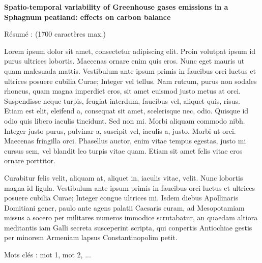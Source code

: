 {\vfill

\begin{center}
	\large \textbf{Spatio-temporal variability of Greenhouse gases emissions in a Sphagnum peatland: effects on carbon balance}
\end{center}

\begin{framed}
	\begin{minipage}{\dimexpr\textwidth-2\fboxrule-2\fboxsep}
	R\'esum\'e : (1700 caract\`eres max.)\par
	Lorem ipsum dolor sit amet, consectetur adipiscing elit. Proin volutpat ipsum id purus ultrices lobortis. Maecenas ornare enim quis eros. Nunc eget mauris ut quam malesuada mattis. Vestibulum ante ipsum primis in faucibus orci luctus et ultrices posuere cubilia Curae; Integer vel tellus. Nam rutrum, purus non sodales rhoncus, quam magna imperdiet eros, sit amet euismod justo metus at orci. Suspendisse neque turpis, feugiat interdum, faucibus vel, aliquet quis, risus. Etiam est elit, eleifend a, consequat sit amet, scelerisque nec, odio. Quisque id odio quis libero iaculis tincidunt. Sed non mi. Morbi aliquam commodo nibh. Integer justo purus, pulvinar a, suscipit vel, iaculis a, justo. Morbi ut orci. Maecenas fringilla orci. Phasellus auctor, enim vitae tempus egestas, justo mi cursus sem, vel blandit leo turpis vitae quam. Etiam sit amet felis vitae eros ornare porttitor.\par
	Curabitur felis velit, aliquam at, aliquet in, iaculis vitae, velit. Nunc lobortis magna id ligula. Vestibulum ante ipsum primis in faucibus orci luctus et ultrices posuere cubilia Curae; Integer congue ultrices mi.
	Isdem diebus Apollinaris Domitiani gener, paulo ante agens palatii Caesaris curam, ad Mesopotamiam missus a socero per militares numeros immodice scrutabatur, an quaedam altiora meditantis iam Galli secreta susceperint scripta, qui conpertis Antiochiae gestis per minorem Armeniam lapsus Constantinopolim petit.\par
Mots cl\'es : mot 1, mot 2, ...
	\end{minipage}
\end{framed}

}
